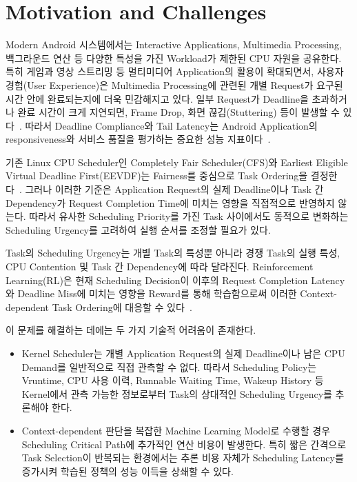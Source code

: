 
\section{Motivation and Challenges}
\label{sec:intro-motivation-and-challenges}
Modern Android 시스템에서는 Interactive Applications, Multimedia Processing, 백그라운드 연산 등 다양한 특성을 가진 Workload가 제한된 CPU 자원을 공유한다.
특히 게임과 영상 스트리밍 등 멀티미디어 Application의 활용이 확대되면서, 사용자 경험(User Experience)은 Multimedia Processing에 관련된 개별 Request가 요구된 시간 안에 완료되는지에 더욱 민감해지고 있다.
일부 Request가 Deadline을 초과하거나 완료 시간이 크게 지연되면, Frame Drop, 화면 끊김(Stuttering) 등이 발생할 수 있다~\cite{androidrender,zheng2024}.
따라서 Deadline Compliance와 Tail Latency는 Android Application의 responsiveness와 서비스 품질을 평가하는 중요한 성능 지표이다~\cite{framepacing,dean2013}.

기존 Linux CPU Scheduler인 Completely Fair Scheduler(CFS)와 Earliest Eligible Virtual Deadline First(EEVDF)는 Fairness를 중심으로 Task Ordering을 결정한다~\cite{cfs,eevdf_linux}.
그러나 이러한 기준은 Application Request의 실제 Deadline이나 Task 간 Dependency가 Request Completion Time에 미치는 영향을 직접적으로 반영하지 않는다.
따라서 유사한 Scheduling Priority를 가진 Task 사이에서도 동적으로 변화하는 Scheduling Urgency를 고려하여 실행 순서를 조정할 필요가 있다.

Task의 Scheduling Urgency는 개별 Task의 특성뿐 아니라 경쟁 Task의 실행 특성, CPU Contention 및 Task 간 Dependency에 따라 달라진다.
Reinforcement Learning(RL)은 현재 Scheduling Decision이 이후의 Request Completion Latency와 Deadline Miss에 미치는 영향을 Reward를 통해 학습함으로써 이러한 Context-dependent Task Ordering에 대응할 수 있다~\cite{sutton2018,deeprm,decima}.

이 문제를 해결하는 데에는 두 가지 기술적 어려움이 존재한다.

\begin{itemize}
    \item Kernel Scheduler는 개별 Application Request의 실제
    Deadline이나 남은 CPU Demand를 일반적으로 직접 관측할 수 없다.
    따라서 Scheduling Policy는 Vruntime, CPU 사용 이력,
    Runnable Waiting Time, Wakeup History 등 Kernel에서 관측
    가능한 정보로부터 Task의 상대적인 Scheduling Urgency를 추론해야 한다.

    \item Context-dependent 판단을 복잡한 Machine Learning
    Model로 수행할 경우 Scheduling Critical Path에 추가적인
    연산 비용이 발생한다. 특히 짧은 간격으로 Task Selection이 반복되는 환경에서는
    추론 비용 자체가 Scheduling Latency를 증가시켜 
    학습된 정책의 성능 이득을 상쇄할 수 있다.

\end{itemize}


